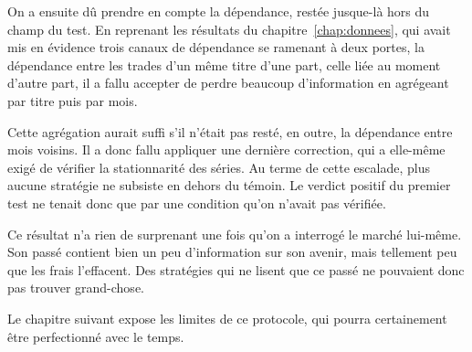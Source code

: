 On a ensuite dû prendre en compte la dépendance, restée jusque-là hors du
champ du test. En reprenant les résultats du chapitre~\ref{chap:donnees}, qui
avait mis en évidence trois canaux de dépendance se ramenant à deux portes,
la dépendance entre les trades d'un même titre d'une part, celle liée au
moment d'autre part, il a fallu accepter de perdre beaucoup d'information en
agrégeant par titre puis par mois.

Cette agrégation aurait suffi s'il n'était pas resté, en outre, la dépendance
entre mois voisins. Il a donc fallu appliquer une dernière correction, qui a
elle-même exigé de vérifier la stationnarité des séries. Au terme de cette
escalade, plus aucune stratégie ne subsiste en dehors du témoin. Le verdict
positif du premier test ne tenait donc que par une condition qu'on n'avait pas
vérifiée.

Ce résultat n'a rien de surprenant une fois qu'on a interrogé le marché
lui-même. Son passé contient bien un peu d'information sur son avenir, mais
tellement peu que les frais l'effacent. Des stratégies qui ne lisent que ce
passé ne pouvaient donc pas trouver grand-chose.

Le chapitre suivant expose les limites de ce protocole, qui pourra certainement
être perfectionné avec le temps.